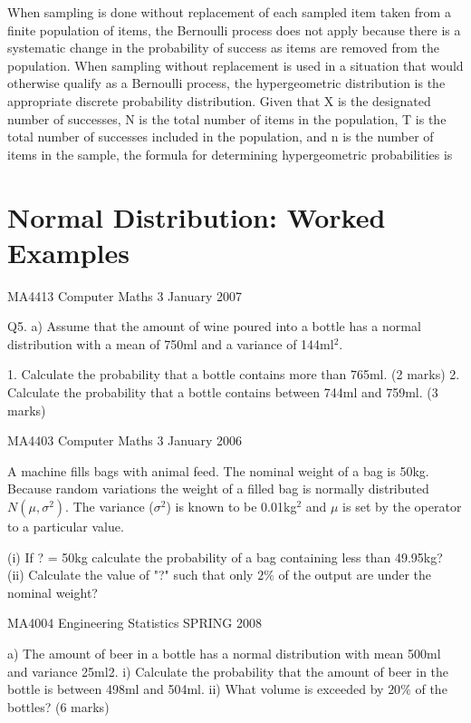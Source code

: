 When sampling is done without replacement of each sampled item taken from a finite population of items, the
Bernoulli process does not apply because there is a systematic change in the probability of success as items are
removed from the population. When sampling without replacement is used in a situation that would otherwise
qualify as a Bernoulli process, the hypergeometric distribution is the appropriate discrete probability distribution.
Given that X is the designated number of successes, N is the total number of items in the population, T is
the total number of successes included in the population, and n is the number of items in the sample, the formula
for determining hypergeometric probabilities is



\section{Normal Distribution: Worked Examples}

MA4413    Computer Maths 3     January 2007


Q5. a) Assume that the amount of wine poured into a bottle has a normal distribution with a mean of 750ml and a variance of 144ml$^2$.

1.   Calculate the probability that a bottle contains more than 765ml. (2 marks)
2.   Calculate the probability that a bottle contains between 744ml and 759ml. (3 marks)

MA4403    Computer Maths 3     January 2006

A machine fills bags with animal feed. The nominal weight of a bag is 50kg.
Because random variations the weight of a filled bag is normally distributed
$N(\mu, \sigma^2)$. The variance ($\sigma^2$) is known to be 0.01kg$^2$ and $\mu$ is set by the
operator to a particular value.

(i) If ? = 50kg calculate the probability of a bag containing less than
49.95kg?
(ii) Calculate the value of "?" such that only $2\%$ of the output are under the
nominal weight?



MA4004     Engineering Statistics    SPRING 2008


a)	The amount of beer in a bottle has a normal distribution with mean 500ml and variance 25ml2.
i)	Calculate the probability that the amount of beer in the bottle is between 498ml and 504ml.
ii)	What volume is exceeded by $20\%$ of the bottles?
(6 marks)





